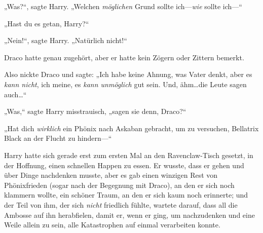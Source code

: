 „Was?“, sagte Harry. „Welchen \emph{möglichen} Grund sollte ich—\emph{wie} sollte ich—“

„Hast du es getan, Harry?“

„Nein!“, sagte Harry. „Natürlich nicht!“

Draco hatte genau zugehört, aber er hatte kein Zögern oder Zittern bemerkt.

Also nickte Draco und sagte: „Ich habe keine Ahnung, was Vater denkt, aber es \emph{kann nicht}, ich meine, es \emph{kann unmöglich} gut sein. Und, ähm…die Leute sagen auch…“

„Was,“ sagte Harry misstrauisch, „sagen sie denn, Draco?“

„Hat dich \emph{wirklich} ein Phönix nach Askaban gebracht, um zu versuchen, Bellatrix Black an der Flucht zu hindern—“


Harry hatte sich gerade erst zum ersten Mal an den Ravenclaw-Tisch gesetzt, in der Hoffnung, einen schnellen Happen zu essen. Er wusste, dass er gehen und über Dinge nachdenken musste, aber es gab einen winzigen Rest von Phönixfrieden (sogar nach der Begegnung mit Draco), an den er sich noch klammern wollte, ein schöner Traum, an den er sich kaum noch erinnerte; und der Teil von ihm, der sich \emph{nicht} friedlich fühlte, wartete darauf, dass all die Ambosse auf ihn herabfielen, damit er, wenn er ging, um nachzudenken und eine Weile allein zu sein, alle Katastrophen auf einmal verarbeiten konnte.

